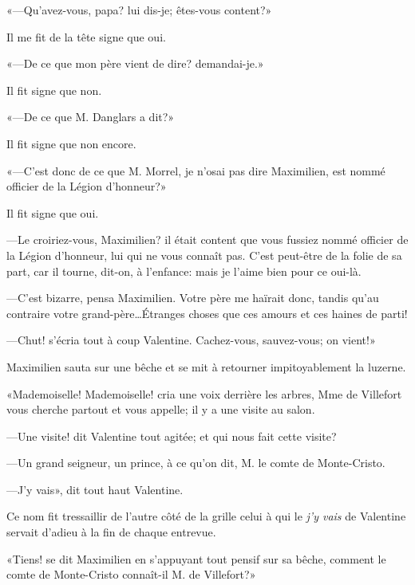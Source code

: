 «—Qu'avez-vous, papa? lui dis-je; êtes-vous content?» 

Il me fit de la tête signe que oui. 

«—De ce que mon père vient de dire? demandai-je.» 

Il fit signe que non. 

«—De ce que M. Danglars a dit?» 

Il fit signe que non encore. 

«—C'est donc de ce que M. Morrel, je n'osai pas dire Maximilien, est nommé officier de la Légion d'honneur?» 

Il fit signe que oui. 

—Le croiriez-vous, Maximilien? il était content que vous fussiez nommé officier de la Légion d'honneur, lui qui ne vous connaît pas. C'est peut-être de la folie de sa part, car il tourne, dit-on, à l'enfance: mais je l'aime bien pour ce oui-là. 

—C'est bizarre, pensa Maximilien. Votre père me haïrait donc, tandis qu'au contraire votre grand-père\dots Étranges choses que ces amours et ces haines de parti! 

—Chut! s'écria tout à coup Valentine. Cachez-vous, sauvez-vous; on vient!» 

Maximilien sauta sur une bêche et se mit à retourner impitoyablement la luzerne. 

«Mademoiselle! Mademoiselle! cria une voix derrière les arbres, Mme de Villefort vous cherche partout et vous appelle; il y a une visite au salon. 

—Une visite! dit Valentine tout agitée; et qui nous fait cette visite? 

—Un grand seigneur, un prince, à ce qu'on dit, M. le comte de Monte-Cristo. 

—J'y vais», dit tout haut Valentine. 

Ce nom fit tressaillir de l'autre côté de la grille celui à qui le \textit{j'y vais} de Valentine servait d'adieu à la fin de chaque entrevue. 

«Tiens! se dit Maximilien en s'appuyant tout pensif sur sa bêche, comment le comte de Monte-Cristo connaît-il M. de Villefort?» 